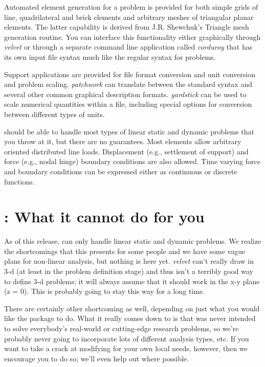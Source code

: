 Automated element generation for a \felt{} problem is provided for both
simple grids of line, quadrilateral and brick elements and arbitrary meshes
of triangular planar elements.  The latter capability is derived
from J.R. Shewchuk's Triangle mesh generation routine.
You can interface this functionality either graphically through {\em velvet}
or through a separate command line application called {\em corduroy} that
has its own input file syntax much like the regular syntax for \felt{}
problems.

Support applications are provided for file format conversion and unit 
conversion and problem scaling.  {\em patchwork} can translate between
the standard \felt{} syntax and several other common graphical description
formats.  {\em yardstick} can be used to scale numerical quantities within
a \felt{} file, including special options for conversion between different
types of units.

\felt{} should be able to handle most types of linear static and dynamic 
problems that
you throw at it, but there are no guarantees.  Most elements allow
arbitrary oriented distributed line loads.  Displacement (e.g., settlement of 
support) and force (e.g., nodal hinge) boundary conditions are also
allowed.  Time varying force and boundary conditions can be expressed either
as continuous or discrete functions.

\section{\felt{}: What it cannot do for you}
As of this release, \felt{} can only handle linear static and dynamic problems.  
We realize the shortcomings that this presents for some people and we have 
some vague plans for non-linear analysis, but nothing is here yet.
{\em velvet} can't really draw in 3-d (at least in the problem definition 
stage) and thus isn't a terribly good way to define 3-d problems; it will 
always assume that it should work in the x-y plane (z = 0).  This is probably 
going to stay this way for a long time.  

There are certainly other shortcoming as well, depending on just what you 
would like the package to do.  What it really comes down to is that \felt{}
was never intended to solve everybody's real-world or cutting-edge research
problems, so we're probably never going to incorporate lots of different
analysis types, etc.  If you want to take a crack at modifying \felt{} for your
own local needs, however,  then we encourage you to do so; we'll even help 
out where possible.
